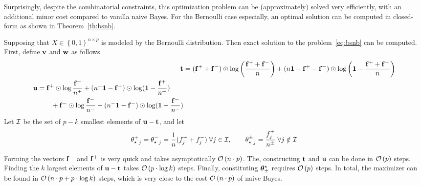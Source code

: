 Surprisingly, despite the combinatorial constraints,
this optimization problem can be (approximately) solved very efficiently,
with an additional minor cost compared to vanilla naive Bayes.
For the Bernoulli case especially, an optimal solution can be computed in closed-form as shown in Theorem~\ref{th:bsnb}.
\begin{theorem}\label{th:bsnb}
        Supposing that $X \in \left\{ 0, 1 \right\}^{n \times p}$ is modeled by the Bernoulli distribution.
        Then exact solution to the problem~\ref{eq:bsnb} can be computed.
        First, define $\mathbf{v}$ and $\mathbf{w}$ as follows
        \begin{align*}
                \mathbf{t} &= (\mathbf{f}^+ + \mathbf{f}^-) \odot \log\left( \frac{\mathbf{f}^+ + \mathbf{f}^-}{n} \right)
                        + (n\mathbf{1} - \mathbf{f}^+ - \mathbf{f}^-) \odot \log\left( \mathbf{1} - \frac{\mathbf{f}^+ + \mathbf{f}^-}{n} \right)\\
                \begin{split}
                        \mathbf{u} &= \mathbf{f}^+ \odot \log \frac{\mathbf{f}^+}{n^+} + (n^+\mathbf{1} - \mathbf{f}^+) \odot \log (\mathbf{1} - \frac{\mathbf{f}^+}{n^+})\\
                        &\qquad + \mathbf{f}^- \odot \log \frac{\mathbf{f}^-}{n^-} + (n^-\mathbf{1} - \mathbf{f}^-) \odot \log (\mathbf{1} - \frac{\mathbf{f}^-}{n^-})
                \end{split}
        \end{align*}
        Let $\mathcal{I}$ be the set of $p - k$ smallest elements of $\mathbf{u} - \mathbf{t}$, and let
        \begin{equation*}
                {\theta^+_\star}_j = {\theta^-_\star}_j = \frac{1}{n}(f_j^+ + f_j^-)
                \;\forall j \in \mathcal{I}
                ,\qquad
                {\theta^\pm_\star}_j = \frac{f^\pm_j}{n^\pm}
                \;\forall j \notin \mathcal{I}
        \end{equation*}
\end{theorem}
Forming the vectors $\mathbf{f}^-$ and $\mathbf{f}^+$ is very quick and takes asymptotically $\mathcal{O}\left( n \cdot p \right)$.
The, constructing $\mathbf{t}$ and $\mathbf{u}$ can be done in $\mathcal{O}\left( p \right)$ steps.
Finding the $k$ largest elements of $\mathbf{u} - \mathbf{t}$ takes $\mathcal{O}\left( p \cdot \log k \right)$ steps.
Finally, constituting $\bm{\theta}_\pm^\star$ requires $\mathcal{O}\left( p \right)$ steps.
In total, the maximizer can be found in $\mathcal{O}\left( n \cdot p + p \cdot \log k \right)$ steps,
which is very close to the cost $\mathcal{O}\left( n \cdot p \right)$ of naive Bayes.

